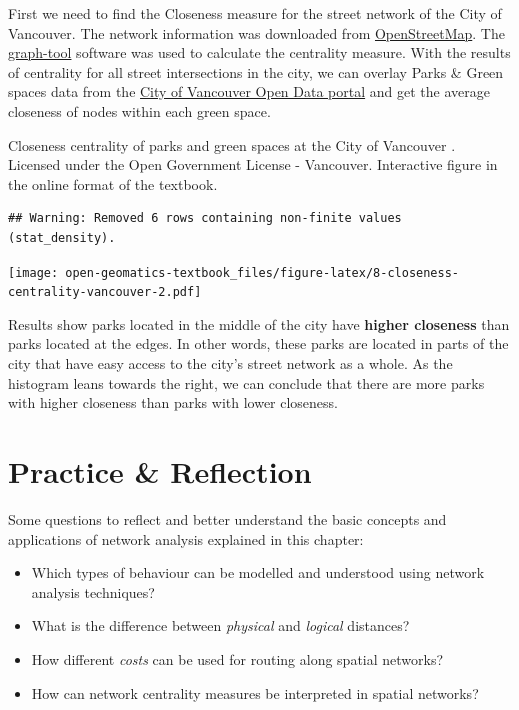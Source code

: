 \documentclass[
]{book}
\providecommand{\tightlist}{%
  \setlength{\itemsep}{0pt}\setlength{\parskip}{0pt}}
\begin{document}
First we need to find the Closeness measure for the street network of the City of Vancouver. The network information was downloaded from \href{https://www.openstreetmap.org/}{OpenStreetMap}. The \href{https://graph-tool.skewed.de/}{graph-tool} software was used to calculate the centrality measure. With the results of centrality for all street intersections in the city, we can overlay Parks \& Green spaces data from the \href{https://opendata.vancouver.ca/explore/dataset/parks-polygon-representation/information/}{City of Vancouver Open Data portal} and get the average closeness of nodes within each green space.

\label{fig:8-closeness-centrality-vancouver}Closeness centrality of parks and green spaces at the City of Vancouver \citep{city_of_vancouver_open_nodate}. Licensed under the Open Government License - Vancouver. Interactive figure in the online format of the textbook.

\begin{verbatim}
## Warning: Removed 6 rows containing non-finite values (stat_density).
\end{verbatim}

\texttt{[image: open-geomatics-textbook\_files/figure-latex/8-closeness-centrality-vancouver-2.pdf]}

Results show parks located in the middle of the city have \textbf{higher closeness} than parks located at the edges. In other words, these parks are located in parts of the city that have easy access to the city's street network as a whole. As the histogram leans towards the right, we can conclude that there are more parks with higher closeness than parks with lower closeness.

\hypertarget{practice-reflection}{%
\section*{Practice \& Reflection}\label{practice-reflection}}

Some questions to reflect and better understand the basic concepts and applications of network analysis explained in this chapter:

\begin{itemize}
\tightlist
\item
  Which types of behaviour can be modelled and understood using network analysis techniques?
\item
  What is the difference between \emph{physical} and \emph{logical} distances?
\item
  How different \emph{costs} can be used for routing along spatial networks?
\item
  How can network centrality measures be interpreted in spatial networks?
\end{itemize}
\end{document}
